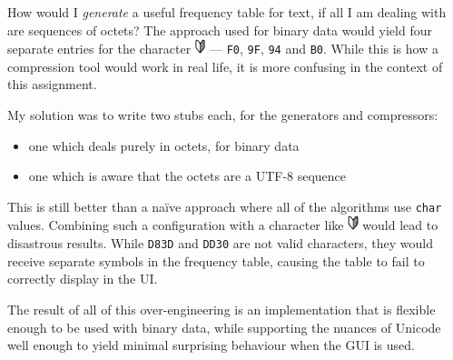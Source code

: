 \documentclass[a4paper,titlepage,12pt]{article}
\begin{document}
How would I \emph{generate} a useful frequency table for text, if all I am
dealing with are sequences of octets? The approach used for binary data would
yield four separate entries for the character \includegraphics[height=12pt]
{U+01F530.png} --- \texttt{F0}, \texttt{9F}, \texttt{94} and \texttt{B0}. While
this is how a compression tool would work in real life, it is more confusing in
the context of this assignment.

My solution was to write two stubs each, for the generators and compressors:

\begin{itemize}
	\item
		one which deals purely in octets, for binary data
	\item
		one which is aware that the octets are a UTF-8 sequence
\end{itemize}

This is still better than a naïve approach where all of the algorithms use
\texttt{char} values. Combining such a configuration with a character like
\includegraphics[height=12pt]{U+01F530.png} would lead to disastrous results.
While \texttt{D83D} and \texttt{DD30} are not valid characters, they would
receive separate symbols in the frequency table, causing the table to fail to
correctly display in the UI.

The result of all of this over-engineering is an implementation that is
flexible enough to be used with binary data, while supporting the nuances of
Unicode well enough to yield minimal surprising behaviour when the GUI is used.
\end{document}
